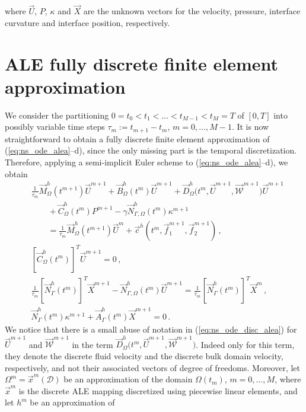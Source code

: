 \documentclass[a4paper,12pt,onecolumn]{article}
\newcommand{\D}{\mathcal D}
\newcommand{\W}{\vec{\mathcal W}}
\newcommand{\Nbulk}{\vec{N}_{\Gamma,\Omega}}
\begin{document}
where $\vec U$, $P$, $\kappa$ and $\vec X$ are the unknown vectors for the
velocity, pressure, interface curvature and interface position, respectively.

\section{ALE fully discrete finite element approximation}\label{sec:ale_fem}
We consider the partitioning  $0= t_0 < t_1 < \ldots < t_{M-1} < t_M = T$ of
$[0,T]$ into possibly variable time steps $\tau_m := t_{m+1}-t_m$, $m=0, \ldots,
M-1$. It is now straightforward to obtain a fully discrete finite element
approximation of (\ref{eq:ns_ode_alea}--d), since the only missing part is the
temporal discretization. Therefore, applying a semi-implicit Euler scheme to
(\ref{eq:ns_ode_alea}--d), we obtain
\begin{subequations}
\begin{align}
& \frac{1}{\tau_m}\vec M^h_\Omega(t^{m+1})\vec U^{m+1} +
\vec B^h_\Omega(t^m) \vec U^{m+1} +
\vec D^h_\Omega\big(t^m,\vec U^{m+1},\W^{m+1}\big)\vec U^{m+1} \nonumber \\
& \qquad + \vec C^h_\Omega(t^m) P^{m+1}
- \gamma \Nbulk^h(t^m) \kappa^{m+1} \nonumber \\
& \qquad = \frac{1}{\tau_m} \vec M^h_\Omega(t^{m+1})\vec U^m
+ \vec c^h(t^m,\vec f_1^{m+1},\vec f_2^{m+1})\,,\label{eq:ns_ode_disc_alea} \\
& [\vec C^h_\Omega(t^m) ]^T \vec U^{m+1} = 0\,,
\label{eq:ns_ode_disc_aleb} \\
& \frac{1}{\tau_m}[\vec N_\Gamma^h(t^m)]^T \vec X^{m+1}
- \Nbulk^h(t^m)\vec U^{m+1} = \frac{1}{\tau_m}[\vec N_\Gamma^h(t^m)]^T
\vec X^m\,, \label{eq:ns_ode_disc_alec}\\
& \vec N_\Gamma^h(t^m) \kappa^{m+1} + \vec A^h_\Gamma(t^m)\vec X^{m+1}
 = 0\,. \label{eq:ns_ode_disc_aled}
\end{align}
\end{subequations}
We notice that there is a small abuse of notation in (\ref{eq:ns_ode_disc_alea})
for $\vec U^{m+1}$ and $\W^{m+1}$ in the term $\vec D^h_\Omega\big(t^{m},\vec
U^{m+1},\W^{m+1}\big)$. Indeed only for this term, they denote the discrete
fluid velocity and the discrete bulk domain velocity, respectively, and not
their associated vectors of degree of freedoms. Moreover, let
$\Omega^m=\vec x^m(\D)$ be an approximation of the domain $\Omega(t_m)$, $m=0
,\ldots, M$, where $\vec x^m$ is the discrete ALE mapping discretized using
piecewise linear elements, and let $h^m$ be an approximation of
\end{document}
